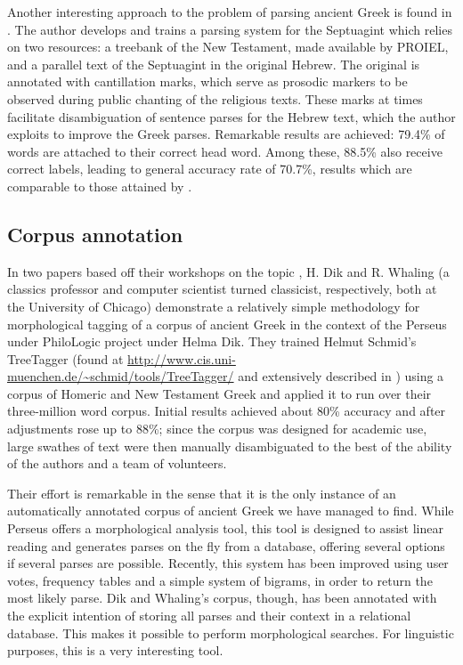 Another interesting approach to the problem of parsing ancient Greek
is found in \cite{lee2010dependency}. The author develops and trains a
parsing system for the Septuagint which relies on two resources: a
treebank of the New Testament, made available by PROIEL, and a
parallel text of the Septuagint in the original Hebrew. The original
is annotated with cantillation marks, which serve as prosodic markers
to be observed during public chanting of the religious texts. These
marks at times facilitate disambiguation of sentence parses for the
Hebrew text, which the author exploits to improve the Greek
parses. Remarkable results are achieved: 79.4\% of words are attached
to their correct head word. Among these, 88.5\% also receive correct
labels, leading to general accuracy rate of 70.7\%, results which are
comparable to those attained by \cite{mambrini2012}.

\subsection{Corpus annotation}
\label{sec:dikwhaling}
In two papers based off their workshops on the topic
\citep{dik2008,dik2009}, H. Dik and R. Whaling (a classics professor
and computer scientist turned classicist, respectively, both at the
University of Chicago) demonstrate a relatively simple methodology for
morphological tagging of a corpus of ancient Greek in the context of
the Perseus under PhiloLogic project under Helma Dik.  They trained
Helmut Schmid's TreeTagger (found at
\url{http://www.cis.uni-muenchen.de/~schmid/tools/TreeTagger/} and
extensively described in \cite{schmid1994,schmid1995}) using a corpus
of Homeric and New Testament Greek and applied it to run over their
three-million word corpus. Initial results achieved about 80\%
accuracy and after adjustments rose up to 88\%; since the corpus was
designed for academic use, large swathes of text were then manually
disambiguated to the best of the ability of the authors and a team of
volunteers.

Their effort is remarkable in the sense that it is the only instance
of an automatically annotated corpus of ancient Greek we have managed
to find. While Perseus offers a morphological analysis tool, this tool
is designed to assist linear reading and generates parses on the fly
from a database, offering several options if several parses are
possible. Recently, this system has been improved using user votes,
frequency tables and a simple system of bigrams, in order to return
the most likely parse. Dik and Whaling's corpus, though, has been
annotated with the explicit intention of storing all parses and their
context in a relational database. This makes it possible to perform
morphological searches. For linguistic purposes, this is a very
interesting tool.
